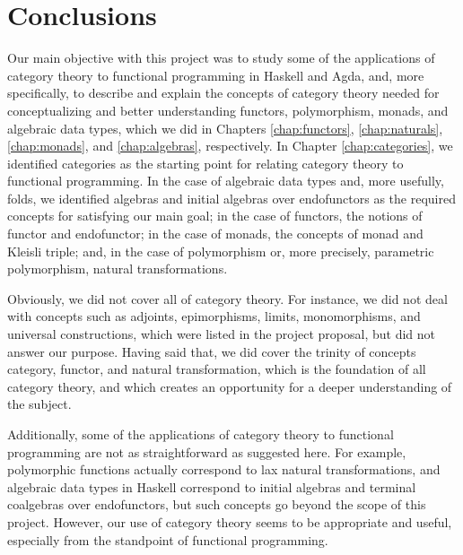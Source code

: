 \chapter{Conclusions}
\label{chap:conclusions}

\begin{epigraphs}
\end{epigraphs}

Our main objective with this project was to study some of the
applications of category theory to functional programming in Haskell
and Agda, and, more specifically, to describe and explain the concepts
of category theory needed for conceptualizing and better understanding
functors, polymorphism, monads, and algebraic data types, which we did
in Chapters \ref{chap:functors}, \ref{chap:naturals},
\ref{chap:monads}, and \ref{chap:algebras}, respectively. In Chapter
\ref{chap:categories}, we identified categories as the starting point
for relating category theory to functional programming. In the case of
algebraic data types and, more usefully, folds, we identified algebras
and initial algebras over endofunctors as the required concepts for
satisfying our main goal; in the case of functors, the notions of
functor and endofunctor; in the case of monads, the concepts of monad
and Kleisli triple; and, in the case of polymorphism or, more
precisely, parametric polymorphism, natural transformations.

Obviously, we did not cover all of category theory. For instance, we
did not deal with concepts such as adjoints, epimorphisms, limits,
monomorphisms, and universal constructions, which were listed in the
project proposal, but did not answer our purpose. Having said that, we
did cover the trinity of concepts category, functor, and natural
transformation, which is the foundation of all category theory, and
which creates an opportunity for a deeper understanding of the
subject.

Additionally, some of the applications of category theory to
functional programming are not as straightforward as suggested here.
For example, polymorphic functions actually correspond to lax natural
transformations, and algebraic data types in Haskell correspond to
initial algebras and terminal coalgebras over endofunctors, but such
concepts go beyond the scope of this project. However, our use of
category theory seems to be appropriate and useful, especially from
the standpoint of functional programming.

